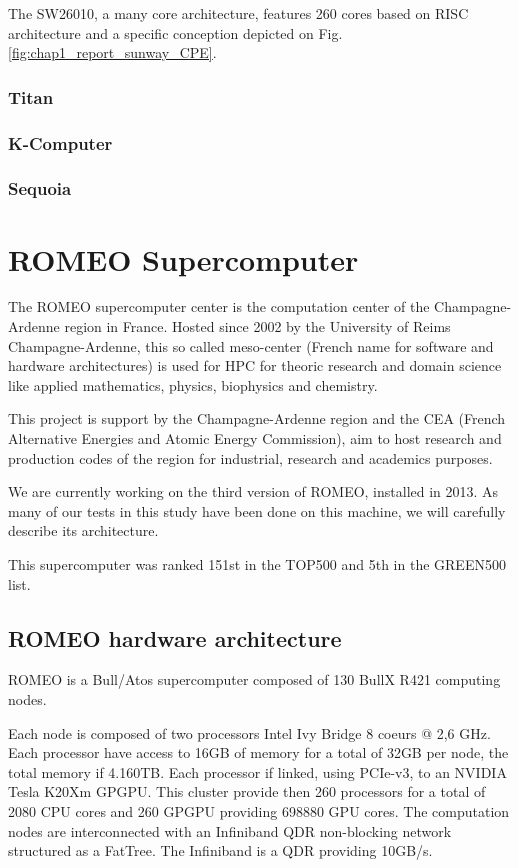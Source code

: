The SW26010, a many core architecture, features 260 cores based on RISC architecture and a specific conception depicted on Fig.\ref{fig:chap1_report_sunway_CPE}.


\subsubsection{Titan}

\subsubsection{K-Computer}
\subsubsection{Sequoia}
\section{ROMEO Supercomputer}

The ROMEO supercomputer center is the computation center of the Champagne-Ardenne region in France. 
Hosted since 2002 by the University of Reims Champagne-Ardenne, this so called meso-center (French name for software and hardware architectures) is used for HPC for theoric research and domain science like applied mathematics, physics, biophysics and chemistry. 

This project is support by the Champagne-Ardenne region and the CEA (French Alternative Energies and Atomic Energy Commission), aim to host research and production codes of the region for industrial, research and academics purposes. 

We are currently working on the third version of ROMEO, installed in 2013. 
As many of our tests in this study have been done on this machine, we will carefully describe its architecture. 

This supercomputer was ranked 151st in the TOP500 and 5th in the GREEN500 list. 

\subsection{ROMEO hardware architecture}
ROMEO is a Bull/Atos supercomputer composed of 130 BullX R421 computing nodes. 

Each node is composed of two processors Intel Ivy Bridge 8 coeurs @ 2,6 GHz. 
Each processor have access to 16GB of memory for a total of 32GB per node, the total memory if 4.160TB. 
Each processor if linked, using PCIe-v3, to an NVIDIA Tesla K20Xm GPGPU. 
This cluster provide then 260 processors for a total of 2080 CPU cores and 260 GPGPU providing 698880 GPU cores. 
The computation nodes are interconnected with an Infiniband QDR non-blocking network structured as a FatTree. 
The Infiniband is a QDR providing 10GB/s. 

